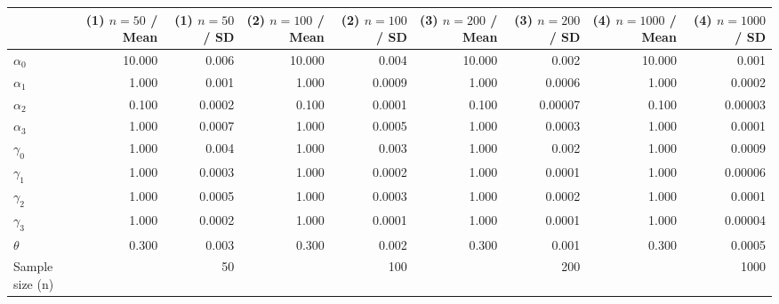 
\begin{tabular}[t]{lrrrrrrrr}
\toprule
  & (1) $n=50$ / Mean & (1) $n=50$ / SD & (2) $n=100$ / Mean & (2) $n=100$ / SD & (3) $n=200$ / Mean & (3) $n=200$ / SD & (4) $n=1000$ / Mean & (4) $n=1000$ / SD\\
\midrule
$\alpha_{0}$ & 10.000 & 0.006 & 10.000 & 0.004 & 10.000 & 0.002 & 10.000 & 0.001\\
$\alpha_{1}$ & 1.000 & 0.001 & 1.000 & 0.0009 & 1.000 & 0.0006 & 1.000 & 0.0002\\
$\alpha_{2}$ & 0.100 & 0.0002 & 0.100 & 0.0001 & 0.100 & 0.00007 & 0.100 & 0.00003\\
$\alpha_{3}$ & 1.000 & 0.0007 & 1.000 & 0.0005 & 1.000 & 0.0003 & 1.000 & 0.0001\\
$\gamma_{0}$ & 1.000 & 0.004 & 1.000 & 0.003 & 1.000 & 0.002 & 1.000 & 0.0009\\
$\gamma_{1}$ & 1.000 & 0.0003 & 1.000 & 0.0002 & 1.000 & 0.0001 & 1.000 & 0.00006\\
$\gamma_{2}$ & 1.000 & 0.0005 & 1.000 & 0.0003 & 1.000 & 0.0002 & 1.000 & 0.0001\\
$\gamma_{3}$ & 1.000 & 0.0002 & 1.000 & 0.0001 & 1.000 & 0.0001 & 1.000 & 0.00004\\
$\theta$ & 0.300 & 0.003 & 0.300 & 0.002 & 0.300 & 0.001 & 0.300 & 0.0005\\
Sample size (n) &  & 50 &  & 100 &  & 200 &  & 1000\\
\bottomrule
\end{tabular}
